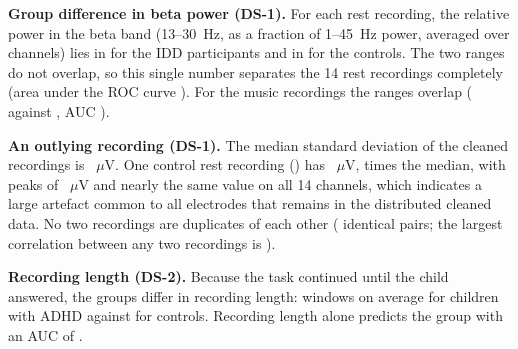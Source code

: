 \textbf{Group difference in beta power (DS-1).} For each rest recording, the relative power in
the beta band (13--30~Hz, as a fraction of 1--45~Hz power, averaged over channels) lies in
 for the IDD participants and in  for the
controls. The two ranges do not overlap, so this single number separates the 14 rest recordings
completely (area under the ROC curve ). For the music recordings the
ranges overlap ( against , AUC
).

\textbf{An outlying recording (DS-1).} The median standard deviation of the
 cleaned recordings is ~$\mu$V. One control rest recording
() has ~$\mu$V,  times the median,
with peaks of ~$\mu$V and nearly the same value on all 14 channels, which
indicates a large artefact common to all electrodes that remains in the distributed cleaned
data. No two recordings are duplicates of each other ( identical pairs;
the largest correlation between any two recordings is ).

\textbf{Recording length (DS-2).} Because the task continued until the child answered, the
groups differ in recording length:  windows on average for children with ADHD
against  for controls. Recording length alone predicts the group with an AUC of
.
